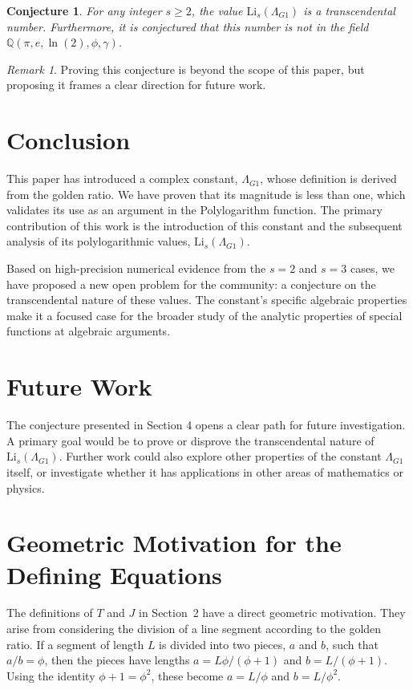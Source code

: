 \documentclass{amsart}
\theoremstyle{plain}
\newtheorem{conjecture}[theorem]{Conjecture}
\theoremstyle{definition}
\theoremstyle{remark}
\newtheorem*{remark}{Remark}
\newcommand{\LambdaG}{\Lambda_{G1}}
\begin{document}
\begin{conjecture}
For any integer $s \ge 2$, the value $\mathrm{Li}_s(\LambdaG)$ is a transcendental number. Furthermore, it is conjectured that this number is not in the field $\mathbb{Q}(\pi, e, \ln(2), \phi, \gamma)$.
\end{conjecture}
\begin{remark}
Proving this conjecture is beyond the scope of this paper, but proposing it frames a clear direction for future work.
\end{remark}

\section{Conclusion}
This paper has introduced a complex constant, $\LambdaG$, whose definition is derived from the golden ratio. We have proven that its magnitude is less than one, which validates its use as an argument in the Polylogarithm function. The primary contribution of this work is the introduction of this constant and the subsequent analysis of its polylogarithmic values, $\mathrm{Li}_s(\LambdaG)$.

Based on high-precision numerical evidence from the $s=2$ and $s=3$ cases, we have proposed a new open problem for the community: a conjecture on the transcendental nature of these values. The constant's specific algebraic properties make it a focused case for the broader study of the analytic properties of special functions at algebraic arguments.

\section{Future Work}
The conjecture presented in Section 4 opens a clear path for future investigation. A primary goal would be to prove or disprove the transcendental nature of $\mathrm{Li}_s(\LambdaG)$. Further work could also explore other properties of the constant $\LambdaG$ itself, or investigate whether it has applications in other areas of mathematics or physics.

\appendix
\section{Geometric Motivation for the Defining Equations}
\label{app:A}
The definitions of $T$ and $J$ in Section~2 have a direct geometric motivation. They arise from considering the division of a line segment according to the golden ratio. If a segment of length $L$ is divided into two pieces, $a$ and $b$, such that $a/b = \phi$, then the pieces have lengths $a = L\phi/(\phi+1)$ and $b=L/(\phi+1)$. Using the identity $\phi+1=\phi^2$, these become $a=L/\phi$ and $b=L/\phi^2$.
\end{document}
